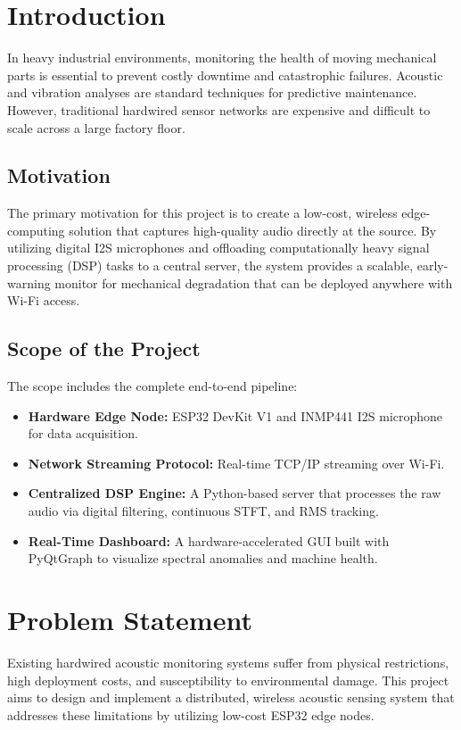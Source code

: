 \documentclass[11pt,a4paper]{article}
\begin{document}
\section{Introduction}
In heavy industrial environments, monitoring the health of moving mechanical parts is essential to prevent costly downtime and catastrophic failures. Acoustic and vibration analyses are standard techniques for predictive maintenance. However, traditional hardwired sensor networks are expensive and difficult to scale across a large factory floor. 

\subsection{Motivation}
The primary motivation for this project is to create a low-cost, wireless edge-computing solution that captures high-quality audio directly at the source. By utilizing digital I2S microphones and offloading computationally heavy signal processing (DSP) tasks to a central server, the system provides a scalable, early-warning monitor for mechanical degradation that can be deployed anywhere with Wi-Fi access.

\subsection{Scope of the Project}
The scope includes the complete end-to-end pipeline:
\begin{itemize}
    \item \textbf{Hardware Edge Node:} ESP32 DevKit V1 and INMP441 I2S microphone for data acquisition.
    \item \textbf{Network Streaming Protocol:} Real-time TCP/IP streaming over Wi-Fi.
    \item \textbf{Centralized DSP Engine:} A Python-based server that processes the raw audio via digital filtering, continuous STFT, and RMS tracking.
    \item \textbf{Real-Time Dashboard:} A hardware-accelerated GUI built with PyQtGraph to visualize spectral anomalies and machine health.
\end{itemize}

\section{Problem Statement}
Existing hardwired acoustic monitoring systems suffer from physical restrictions, high deployment costs, and susceptibility to environmental damage. This project aims to design and implement a distributed, wireless acoustic sensing system that addresses these limitations by utilizing low-cost ESP32 edge nodes.
\end{document}
